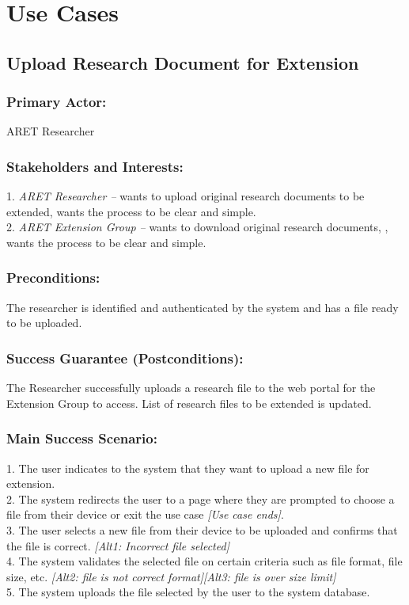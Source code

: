 \documentclass[12pt,letterpaper]{article}
\begin{document}
\clearpage
\section{Use Cases}

\subsection{Upload Research Document for Extension}
\subsubsection*{Primary Actor:} ARET Researcher
\subsubsection*{Stakeholders and Interests:}
1. \emph{ARET Researcher --} wants to upload original research documents to be extended, wants the process to be clear and simple.\\[10pt]
2. \emph{ARET Extension Group --} wants to download original research documents, , wants the process to be clear and simple.

\subsubsection*{Preconditions:}
The researcher is identified and authenticated by the system and has a file ready to be uploaded.

\subsubsection*{Success Guarantee (Postconditions):}
The Researcher successfully uploads a research file to the web portal for the Extension Group to access. List of research files to be extended is updated.

\subsubsection*{Main Success Scenario:}
1. The user indicates to the system that they want to upload a new file for extension.\\
2. The system redirects the user to a page where they are prompted to choose a file from their device or exit the use case \emph{[Use case ends]}.\\
3. The user selects a new file from their device to be uploaded and confirms that the file is correct. \emph{[Alt1: Incorrect file selected]}\\
4. The system validates the selected file on certain criteria such as file format, file size, etc. \emph{[Alt2: file is not correct format][Alt3: file is over size limit]}\\
5. The system uploads the file selected by the user to the system database. 
\end{document}
